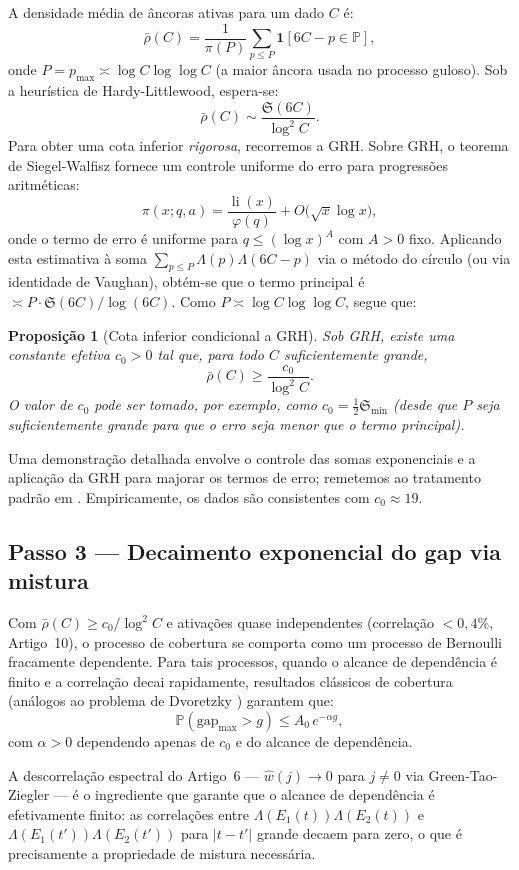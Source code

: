 \documentclass[11pt]{article}
\newtheorem{proposition}[theorem]{Proposição}
\theoremstyle{definition}
\begin{document}
	A densidade média de âncoras ativas para um dado $C$ é:
	\[
	\bar\rho(C) = \frac{1}{\pi(P)}\sum_{p\le P}\mathbf{1}[6C-p\in\mathbb{P}],
	\]
	onde $P=p_{\max}\asymp\log C\log\log C$ (a maior âncora usada no processo guloso). Sob a heurística de Hardy-Littlewood, espera-se:
	\[
	\bar\rho(C)\sim\frac{\mathfrak{S}(6C)}{\log^2 C}.
	\]
	Para obter uma cota inferior \emph{rigorosa}, recorremos a GRH. Sobre GRH, o teorema de Siegel-Walfisz fornece um controle uniforme do erro para progressões aritméticas:
	\[
	\pi(x;q,a)=\frac{\operatorname{li}(x)}{\varphi(q)}+O\!\bigl(\sqrt{x}\log x\bigr),
	\]
	onde o termo de erro é uniforme para $q\le (\log x)^A$ com $A>0$ fixo. Aplicando esta estimativa à soma $\sum_{p\le P}\Lambda(p)\Lambda(6C-p)$ via o método do círculo (ou via identidade de Vaughan), obtém-se que o termo principal é $\asymp P\cdot \mathfrak{S}(6C)/\log(6C)$. Como $P\asymp\log C\log\log C$, segue que:
	
	\begin{proposition}[Cota inferior condicional a GRH]
		Sob GRH, existe uma constante efetiva $c_0>0$ tal que, para todo $C$ suficientemente grande,
		\[
		\bar\rho(C)\ge \frac{c_0}{\log^2 C}.
		\]
		O valor de $c_0$ pode ser tomado, por exemplo, como $c_0 = \frac{1}{2}\mathfrak{S}_{\min}$ (desde que $P$ seja suficientemente grande para que o erro seja menor que o termo principal).
	\end{proposition}
	
	Uma demonstração detalhada envolve o controle das somas exponenciais e a aplicação da GRH para majorar os termos de erro; remetemos ao tratamento padrão em \cite{IK}. Empiricamente, os dados são consistentes com $c_0\approx 19$.
	
	\subsection{Passo 3 — Decaimento exponencial do gap via mistura}
	
	Com $\bar\rho(C)\ge c_0/\log^2 C$ e ativações quase independentes (correlação $<0{,}4\%$, Artigo~10), o processo de cobertura se comporta como um processo de Bernoulli fracamente dependente. Para tais processos, quando o alcance de dependência é finito e a correlação decai rapidamente, resultados clássicos de cobertura (análogos ao problema de Dvoretzky \cite{dvoretzky}) garantem que:
	\[
	\mathbb{P}(\mathrm{gap}_{\max}>g)\le A_0\,e^{-\alpha g},
	\]
	com $\alpha>0$ dependendo apenas de $c_0$ e do alcance de dependência.
	
	A descorrelação espectral do Artigo~6 — $\widehat{w}(j)\to 0$ para $j\neq 0$ via Green-Tao-Ziegler — é o ingrediente que garante que o alcance de dependência é efetivamente finito: as correlações entre $\Lambda(E_1(t))\Lambda(E_2(t))$ e $\Lambda(E_1(t'))\Lambda(E_2(t'))$ para $|t-t'|$ grande decaem para zero, o que é precisamente a propriedade de mistura necessária.
	
\end{document}
